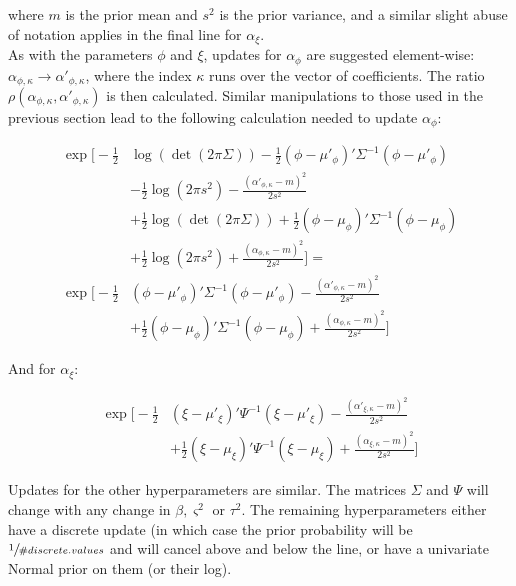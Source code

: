 \documentclass{article}
\begin{document}
where $m$ is the prior mean and $s^2$ is the prior variance, and a similar slight abuse of notation applies in the final line for $\alpha_\xi$.
\\

As with the parameters $\phi$ and $\xi$, updates for $\alpha_\phi$ are suggested element-wise: $\alpha_{\phi,\kappa} \to \alpha'_{\phi,\kappa}$, where the index $\kappa$ runs over the vector of coefficients. The ratio $\rho(\alpha_{\phi,\kappa}, \alpha'_{\phi,\kappa})$ is then calculated. Similar manipulations to those used in the previous section lead to the following calculation needed to update $\alpha_\phi$:

\begin{align}
\exp \Big[ - \frac{1}{2} & \log(\det(2 \pi \Sigma)) -\frac{1}{2} (\phi - \mu'_\phi)' \Sigma^{-1} (\phi - \mu'_\phi) \nonumber \\
& - \frac{1}{2} \log(2 \pi s^2) -\frac{(\alpha'_{\phi,\kappa} - m)^2}{2 s^2} \nonumber \\
& + \frac{1}{2} \log(\det(2 \pi \Sigma)) + \frac{1}{2} (\phi - \mu_\phi)' \Sigma^{-1} (\phi - \mu_\phi) \nonumber \\
& + \frac{1}{2} \log(2 \pi s^2) + \frac{(\alpha_{\phi,\kappa} - m)^2}{2 s^2} \Big] = \nonumber \\
\exp \Big[ -\frac{1}{2} & (\phi - \mu'_\phi)' \Sigma^{-1} (\phi - \mu'_\phi) -\frac{(\alpha'_{\phi,\kappa} - m)^2}{2 s^2} \nonumber \\
& + \frac{1}{2} (\phi - \mu_\phi)' \Sigma^{-1} (\phi - \mu_\phi) +  \frac{(\alpha_{\phi,\kappa} - m)^2}{2 s^2}
\Big] \label{3eq:2a1}
\end{align}

And for $\alpha_\xi$:

\begin{align}
\exp \Big[ -\frac{1}{2} & (\xi - \mu'_\xi)' \Psi^{-1} (\xi - \mu'_\xi) -\frac{(\alpha'_{\xi,\kappa} - m)^2}{2 s^2} \nonumber \\
& + \frac{1}{2} (\xi - \mu_\xi)' \Psi^{-1} (\xi - \mu_\xi) + \frac{(\alpha_{\xi,\kappa} - m)^2}{2 s^2}
\Big] \label{3eq:2a2}
\end{align}

Updates for the other hyperparameters are similar. The matrices $\Sigma$ and $\Psi$ will change with any change in $\beta, \varsigma^2$ or $\tau^2$. The remaining hyperparameters either have a discrete update (in which case the prior probability will be $\sfrac{1}{\#discrete.values}$ and will cancel above and below the line, or have a univariate Normal prior on them (or their log). \\
\end{document}

